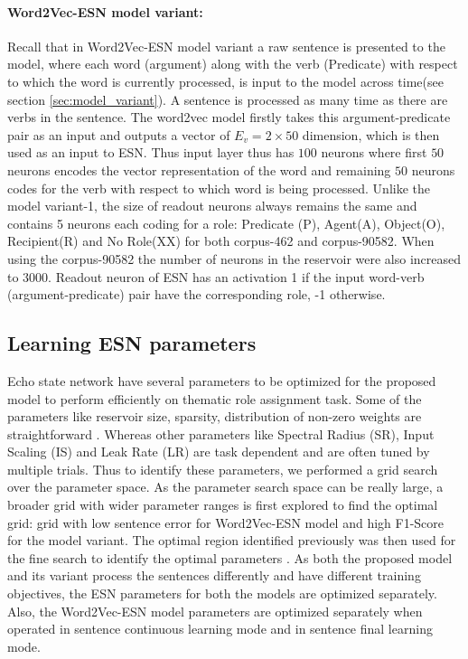 \paragraph{Word2Vec-ESN model variant:} Recall that in Word2Vec-ESN model variant a raw sentence is presented to the model, where each word (argument) along with the verb (Predicate) with respect to which the word is currently processed, is input to the model across time(see section \ref{sec:model_variant}). A sentence is processed as many time as there are verbs in the sentence. The word2vec model firstly takes this argument-predicate pair as an input and outputs a vector of $E_{v} = 2 \times 50$ dimension, which is then used as an input to ESN. Thus input layer thus has $100$ neurons where first $50$ neurons encodes the vector representation of the word and remaining $50$ neurons codes for the verb with respect to which word is being processed. Unlike the model variant-1, the size of readout neurons always remains the same and contains 5 neurons each coding for a role: Predicate (P), Agent(A), Object(O), Recipient(R) and No Role(XX) for both corpus-462 and corpus-90582. When using the corpus-90582 the number of neurons in the reservoir were also increased to 3000. Readout neuron of ESN has an activation 1 if the input word-verb (argument-predicate) pair have the corresponding role, -1 otherwise. 

\subsection{Learning ESN parameters}

Echo state network have several parameters to be optimized for the proposed model to perform efficiently on thematic role assignment task. Some of the parameters like reservoir size, sparsity, distribution of non-zero weights are straightforward \cite{esn:practical_guide}. Whereas other parameters like Spectral Radius (SR), Input Scaling (IS) and Leak Rate (LR) are task dependent and are often tuned by multiple trials. Thus to identify these parameters, we performed a grid search over the parameter space. As the parameter search space can be really large, a broader grid with wider parameter ranges is first explored to find the optimal grid: grid with low sentence error for Word2Vec-ESN model and high F1-Score for the model variant. The optimal region identified previously was then used for the fine search to identify the optimal parameters \cite{esn:practical_guide}. As both the proposed model and its variant process the sentences differently and have different training objectives, the ESN parameters for both the models are optimized separately. Also, the Word2Vec-ESN model parameters are optimized separately when operated in sentence continuous learning mode and in sentence final learning mode.

